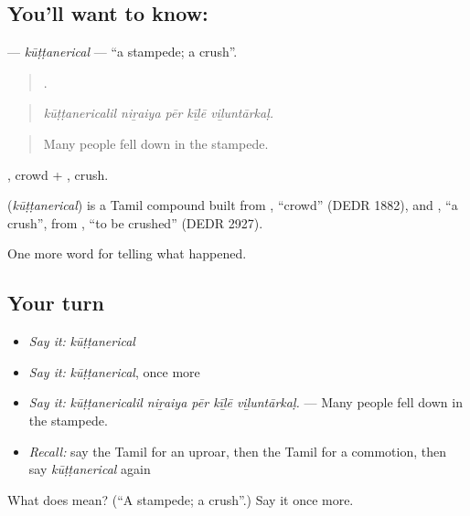 \subsection*{You'll want to know: }
\textbf{} — \emph{kūṭṭanerical} — \textquotedblleft{}a stampede; a crush\textquotedblright{}.

\begin{quote}
    .
\end{quote}

\begin{quote}
\emph{kūṭṭanericalil niṟaiya pēr kīḻē viḻuntārkaḷ.}
\end{quote}

\begin{quote}
Many people fell down in the stampede.
\end{quote}

, crowd + , crush.

\begin{cousinweb}
\textbf{} (\emph{kūṭṭanerical}) is a Tamil compound built from , \textquotedblleft{}crowd\textquotedblright{} (DEDR 1882), and , \textquotedblleft{}a crush\textquotedblright{}, from , \textquotedblleft{}to be crushed\textquotedblright{} (DEDR 2927).
\end{cousinweb}

\begin{grammarlens}[title={What you've built}]
One more word for telling what happened.
\end{grammarlens}

\subsection*{Your turn}
\begin{itemize}
\raggedright
  \item \emph{Say it:} \emph{kūṭṭanerical}
  \item \emph{Say it:} \emph{kūṭṭanerical}, once more
  \item \emph{Say it:} \emph{kūṭṭanericalil niṟaiya pēr kīḻē viḻuntārkaḷ.} — Many people fell down in the stampede.
  \item \emph{Recall:} say the Tamil for an uproar, then the Tamil for a commotion, then say \emph{kūṭṭanerical} again
\end{itemize}

\begin{tcolorbox}[breakable,colback=teal!4,colframe=teal!35!black,title={Before you move on}]
What does  mean? (\textquotedblleft{}A stampede; a crush\textquotedblright{}.) Say it once more.
\end{tcolorbox}
